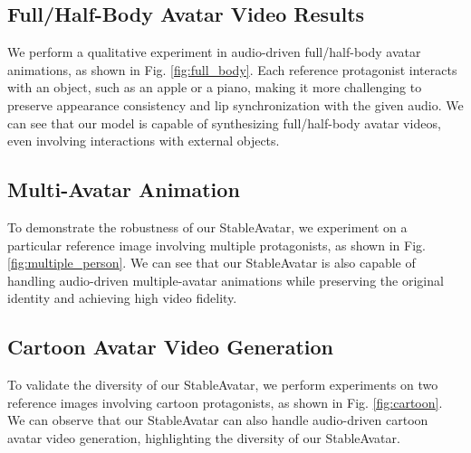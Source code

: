 \subsection{Full/Half-Body Avatar Video Results}
\label{supp:full_body}
We perform a qualitative experiment in audio-driven full/half-body avatar animations, as shown in Fig. \ref{fig:full_body}.
Each reference protagonist interacts with an object, such as an apple or a piano, making it more challenging to preserve appearance consistency and lip synchronization with the given audio.
We can see that our model is capable of synthesizing full/half-body avatar videos, even involving interactions with external objects.

\subsection{Multi-Avatar Animation}
\label{supp:multi_avatar}
To demonstrate the robustness of our StableAvatar, we experiment on a particular reference image involving multiple protagonists, as shown in Fig. \ref{fig:multiple_person}. We can see that our StableAvatar is also capable of handling audio-driven multiple-avatar animations while preserving the original identity and achieving high video fidelity.

\subsection{Cartoon Avatar Video Generation}
\label{supp:cartoon}
To validate the diversity of our StableAvatar, we perform experiments on two reference images involving cartoon protagonists, as shown in Fig. \ref{fig:cartoon}. We can observe that our StableAvatar can also handle audio-driven cartoon avatar video generation, highlighting the diversity of our StableAvatar.


